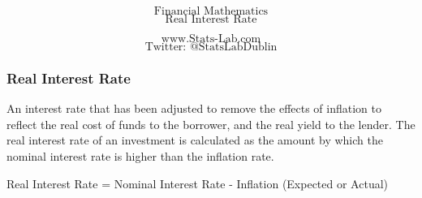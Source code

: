 \documentclass{beamer}
\begin{document}
\begin{frame}
\bigskip
{
\Huge
\[ \mbox{Financial Mathematics}  \]
\huge
\[ \mbox{Real Interest Rate}  \]
}

{
\LARGE
\[ \mbox{www.Stats-Lab.com}  \]
\[ \mbox{Twitter: @StatsLabDublin} \]
}
\end{frame}

\begin{frame}
\frametitle{Real Interest Rate}
\Large
An interest rate that has been adjusted to remove the effects of inflation to reflect the real cost of funds to the borrower, and the real yield to the lender. The real interest rate of an investment is calculated as the amount by which the nominal interest rate is higher than the inflation rate. 

Real Interest Rate = Nominal Interest Rate - Inflation (Expected or Actual)
\end{frame}
\end{document}
